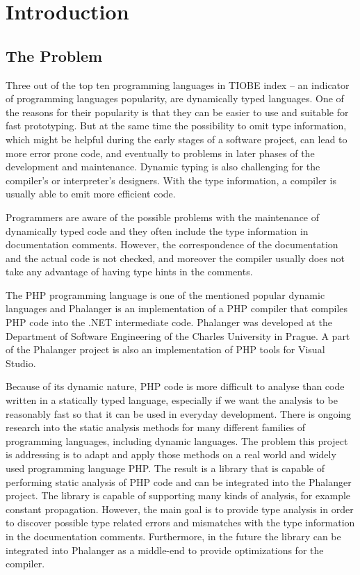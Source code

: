 \chapter{Introduction}

    \section{The Problem}
    
    Three out of the top ten programming languages in TIOBE index\cite{tiobe} -- 
    an indicator of programming languages popularity, are dynamically typed languages. 
    One of the reasons for their popularity is that they can be easier to 
    use and suitable for fast prototyping.
    But at the same time the possibility to omit type information, which might 
    be helpful during the early stages of a software project, can lead to more 
    error prone code, and eventually to problems in later phases of the 
    development and maintenance. Dynamic typing is also challenging for the 
    compiler's or interpreter's designers. With the type information, 
    a compiler is usually able to emit more efficient code.
    
    Programmers are aware of the possible problems with the maintenance of 
    dynamically typed code and they often include the type information in 
    documentation comments. However, the correspondence of the documentation 
    and the actual code is not checked, and moreover the compiler usually 
    does not take any advantage of having type hints in the comments.
    
    The PHP programming language is one of the mentioned popular dynamic 
    languages and Phalanger \cite{benda2006phalanger} is an implementation 
    of a PHP compiler that compiles PHP code into the .NET intermediate code. 
    Phalanger was developed at the Department of Software Engineering 
    of the Charles University in Prague. A part of the Phalanger 
    project is also an implementation of PHP tools for 
    Visual Studio.

    Because of its dynamic nature, PHP code is more difficult to analyse 
    than code written in a statically typed language, especially if we want the 
    analysis to be reasonably fast so that it can be used 
    in everyday development.  There is ongoing research into the 
    static analysis methods for many different families of programming languages, 
    including dynamic languages. The problem this project is addressing 
    is to adapt and apply those methods on a real world and widely 
    used programming language PHP. The result is a library that is capable of 
    performing static analysis of PHP code and can be integrated into 
    the Phalanger project. The library is capable of supporting many 
    kinds of analysis, for example constant propagation. However, the main goal 
    is to provide type analysis in order to discover possible type 
    related errors and mismatches with the type information in the 
    documentation comments. Furthermore, in the future the library 
    can be integrated into Phalanger as a middle-end to provide 
    optimizations for the compiler.

